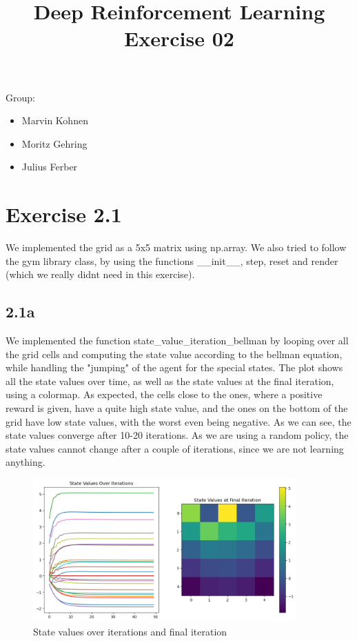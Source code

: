 \documentclass{article} %
\begin{document}
	
	\title{Deep Reinforcement Learning Exercise 02}
	\maketitle
	
	Group:
	\begin{itemize}
		\item Marvin Kohnen
		\item Moritz Gehring
		\item Julius Ferber 
		
	\end{itemize}
	\section{Exercise 2.1}
	We implemented the grid as a 5x5 matrix using np.array. We also tried to follow the gym library class, by using the functions \_\_init\_\_, step, reset and render (which we really didnt need in this exercise). 
	\subsection{2.1a}
	We implemented the function state\_value\_iteration\_bellman by looping over all the grid cells and computing the state value according to the bellman equation, while handling the "jumping" of the agent for the special states. 
	The plot shows all the state values over time, as well as the state values at the final iteration, using a colormap. As expected, the cells close to the ones, where a positive reward is given, have a quite high state value, and the ones on the bottom of the grid have low state values, with the worst even being negative. 
	As we can see, the state values converge after 10-20 iterations. As we are using a random policy, the state values cannot change after a couple of iterations, since we are not learning anything. 
	
	\begin{figure}[h!]
		\centering
		\includegraphics[width=0.9\textwidth]{images/state_values.png}
		\caption{State values over iterations and final iteration}
		\label{fig:2}
	\end{figure}
		
\end{document}
